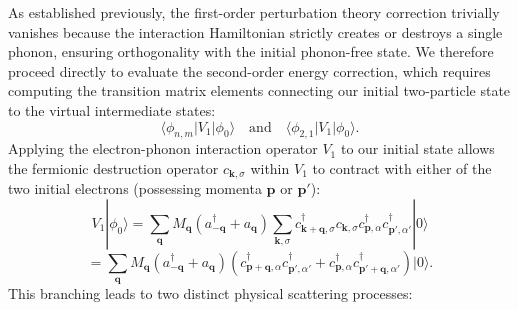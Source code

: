 As established previously, the first-order perturbation theory correction trivially vanishes because the interaction Hamiltonian strictly creates or destroys a single phonon, ensuring orthogonality with the initial phonon-free state. We therefore proceed directly to evaluate the second-order energy correction, which requires computing the transition matrix elements connecting our initial two-particle state to the virtual intermediate states:
\[
    \langle \phi_{n,m} | V_1 | \phi_0 \rangle \quad \text{and} \quad \langle \phi_{2,1} | V_1 | \phi_0 \rangle.
\]
Applying the electron-phonon interaction operator \( V_1 \) to our initial state allows the fermionic destruction operator \( c_{\mathbf{k},\sigma} \) within \( V_1 \) to contract with either of the two initial electrons (possessing momenta \( \mathbf{p} \) or \( \mathbf{p}' \)):
\[
    V_1 |\phi_0\rangle = \sum_{\mathbf{q}} M_{\mathbf{q}} (a_{-\mathbf{q}}^\dagger + a_{\mathbf{q}}) \sum_{\mathbf{k},\sigma} c_{\mathbf{k}+\mathbf{q},\sigma}^\dagger c_{\mathbf{k},\sigma} c_{\mathbf{p},\alpha}^\dagger c_{\mathbf{p}',\alpha'}^\dagger |0\rangle
\]
\[
    = \sum_{\mathbf{q}} M_{\mathbf{q}} (a_{-\mathbf{q}}^\dagger + a_{\mathbf{q}}) \left( c_{\mathbf{p}+\mathbf{q},\alpha}^\dagger c_{\mathbf{p}',\alpha'}^\dagger + c_{\mathbf{p},\alpha}^\dagger c_{\mathbf{p}'+\mathbf{q},\alpha'}^\dagger \right) |0\rangle.
\]
This branching leads to two distinct physical scattering processes:
